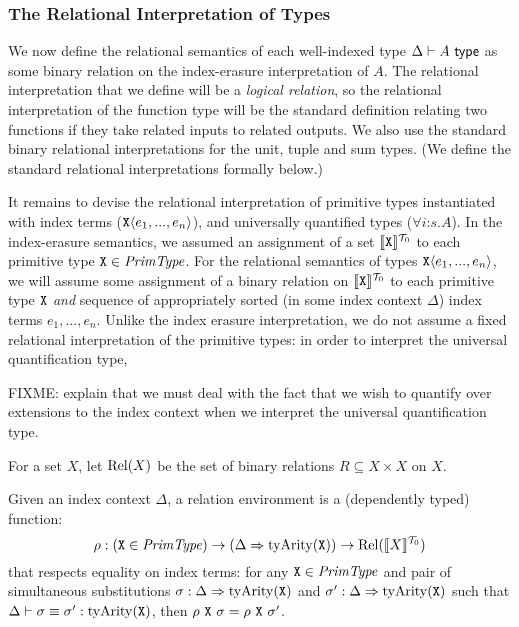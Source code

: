 \subsubsection{The Relational Interpretation of Types}
\label{sec:relational-semantics}

We now define the relational semantics of each well-indexed type
$\Delta \vdash A \textsf{ type}$ as some binary relation on the index-erasure
interpretation of $A$. The relational interpretation that we define
will be a \emph{logical relation}, so the relational interpretation of
the function type will be the standard definition relating two
functions if they take related inputs to related outputs. We also use
the standard binary relational interpretations for the unit, tuple and
sum types. (We define the standard relational interpretations formally
below.)

It remains to devise the relational interpretation of primitive types
instantiated with index terms ($\texttt{X}\langle e_1,...,e_n \rangle$), and
universally quantified types ($\forall i\mathord:s. A$). In the
index-erasure semantics, we assumed an assignment of a set
$\llbracket \texttt{X} \rrbracket^{\mathcal{T}_0}$ to each primitive type $\texttt{X} \in
\mathit{PrimType}$. For the relational semantics of types
$\texttt{X}\langle e_1,...,e_n \rangle$, we will assume some assignment of a binary
relation on $\llbracket \texttt{X} \rrbracket^{\mathcal{T}_0}$ to each primitive type
$\texttt{X}$ \emph{and} sequence of appropriately sorted (in some
index context $\Delta$) index terms $e_1,...,e_n$. Unlike the index
erasure interpretation, we do not assume a fixed relational
interpretation of the primitive types: in order to interpret the
universal quantification type, 

FIXME: explain that we must deal with the fact that we wish to
quantify over extensions to the index context when we interpret the
universal quantification type.

For a set $X$, let $\mathrm{Rel}(X)$ be the set of binary relations $R
\subseteq X \times X$ on $X$.

Given an index context $\Delta$, a relation environment is a
(dependently typed) function:
\begin{displaymath}
  \rho : (\texttt{X} \in \mathit{PrimType}) \to (\Delta \Rightarrow \mathrm{tyArity}(\texttt{X})) \to \mathrm{Rel}(\llbracket X \rrbracket^{\mathcal{T}_0})
\end{displaymath}
that respects equality on index terms: for any $\texttt{X} \in
\mathit{PrimType}$ and pair of simultaneous substitutions $\sigma : \Delta
\Rightarrow \mathrm{tyArity}(\texttt{X})$ and $\sigma' : \Delta
\Rightarrow \mathrm{tyArity}(\texttt{X})$ such that $\Delta \vdash
\sigma \equiv \sigma' : \mathrm{tyArity}(\texttt{X})$, then $\rho\
\texttt{X}\ \sigma = \rho\ \texttt{X}\ \sigma'$.

